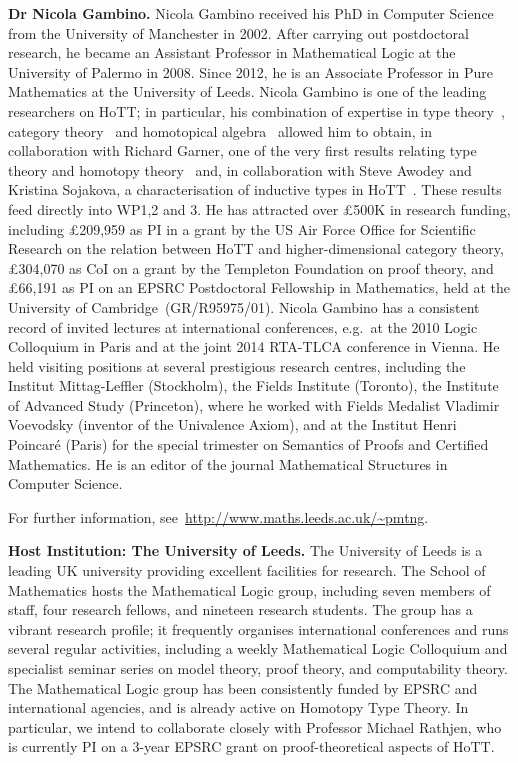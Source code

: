 \documentclass[a4paper,11pt]{article}
\begin{document}
\textbf{Dr Nicola Gambino.} Nicola Gambino received his PhD in
Computer Science from the University of Manchester in 2002. After
carrying out postdoctoral research, he became an Assistant Professor
in Mathematical Logic at the University of Palermo in 2008. Since
2012, he is an Associate Professor in Pure Mathematics at the
University of Leeds. Nicola Gambino is one of the leading researchers
on HoTT; in particular, his combination of expertise in type
theory~\cite{GambinoN:gentti}, category theory~\cite{GambinoN:polfpm}
and homotopical algebra~\cite{GambinoN:homl2c,GambinoN:weilsh} allowed
him to obtain, in collaboration with Richard Garner, one of the very
first results relating type theory and homotopy
theory~\cite{GambinoN:idetwfs} and, in collaboration with Steve Awodey
and Kristina Sojakova, a characterisation of inductive types in
HoTT~\cite{awodeyGamSoja:indTypesInHTT}. These results feed directly
into WP1,2 and 3. He has attracted over \pounds500K in research
funding, including \pounds 209,959 as PI in a grant by the US Air
Force Office for Scientific Research on the relation between HoTT and
higher-dimensional category theory, \pounds 304,070 as CoI on a grant
by the Templeton Foundation on proof theory, and \pounds 66,191 as PI
on an EPSRC Postdoctoral Fellowship in Mathematics, held at the
University of Cambridge~(GR/R95975/01).  Nicola Gambino has a
consistent record of invited lectures at international conferences,
{e.g.}~at the 2010 Logic Colloquium in Paris and at the joint 2014
RTA-TLCA conference in Vienna. He held visiting positions at several
prestigious research centres, including the Institut Mittag-Leffler
(Stockholm), the Fields Institute (Toronto), the Institute of Advanced
Study (Princeton), where he worked with Fields Medalist Vladimir
Voevodsky (inventor of the Univalence Axiom), and at the Institut
Henri Poincar\'e (Paris) for the special trimester on Semantics of
Proofs and Certified Mathematics.  He is an editor of the journal
Mathematical Structures in Computer Science.

For further information,  see~\url{http://www.maths.leeds.ac.uk/~pmtng}.

\textbf{Host Institution: The University of Leeds.} The University of
Leeds is a leading UK university providing
excellent facilities for research. The School of Mathematics hosts the
Mathematical Logic group, including seven members of staff, four
research fellows, and nineteen research students. The group has a
vibrant research profile; it frequently organises
international conferences and runs several regular activities,
including a weekly Mathematical Logic Colloquium and specialist
seminar series on model theory, proof theory, and computability
theory. The Mathematical Logic group has been consistently funded by
EPSRC and international agencies, and is already active on Homotopy
Type Theory. In particular, we intend to collaborate closely with
Professor Michael Rathjen, who is currently PI
on a 3-year EPSRC grant on proof-theoretical aspects of HoTT. 
\end{document}
